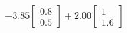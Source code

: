 \documentclass[preview]{standalone}
\begin{document}
\begin{align*}
-3.85 \begin{bmatrix} 0.8 \\ 0.5 \end{bmatrix} + 2.00 \begin{bmatrix} 1 \\ 1.6 \end{bmatrix}
\end{align*}
\end{document}
